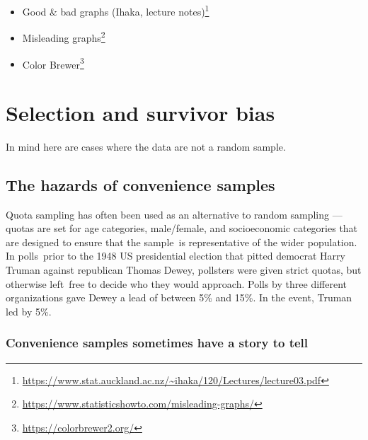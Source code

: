 \documentclass[
  10pt,
  b5paper]{book}
\providecommand{\tightlist}{%
  \setlength{\itemsep}{0pt}\setlength{\parskip}{0pt}}
\begin{document}
\begin{itemize}
\tightlist
\item
  Good \& bad graphs (Ihaka, lecture notes)\footnote{\url{https://www.stat.auckland.ac.nz/~ihaka/120/Lectures/lecture03.pdf}}
\item
  Misleading graphs\footnote{\url{https://www.statisticshowto.com/misleading-graphs/}}
\item
  Color Brewer\footnote{\url{https://colorbrewer2.org/}}
\end{itemize}

\hypertarget{selection-and-survivor-bias}{%
\chapter{Selection and survivor bias}\label{selection-and-survivor-bias}}

In mind here are cases where the data are not a random sample.

\hypertarget{the-hazards-of-convenience-samples}{%
\section{The hazards of convenience samples}\label{the-hazards-of-convenience-samples}}

Quota sampling has often been used as an alternative to random
sampling --- quotas are set for age categories, male/female,
and socioeconomic categories that are designed to ensure that
the sample~is representative of the wider population.
In polls~prior to the 1948 US presidential election that
pitted democrat Harry Truman against republican Thomas Dewey,
pollsters were given strict quotas, but otherwise left~free to
decide who they would approach. Polls by three different
organizations gave Dewey a lead of between 5\% and 15\%. In the
event, Truman led by 5\%.

\hypertarget{convenience-samples-sometimes-have-a-story-to-tell}{%
\subsection*{Convenience samples sometimes have a story to tell}\label{convenience-samples-sometimes-have-a-story-to-tell}}
\end{document}
